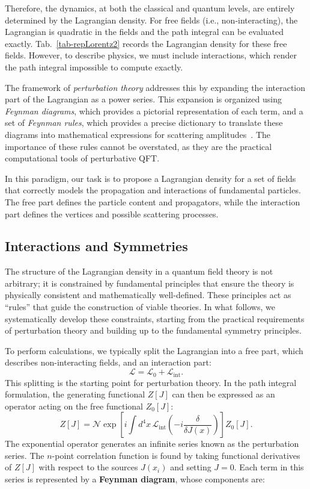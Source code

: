 Therefore, the dynamics, at both the classical and quantum levels, are entirely determined by the Lagrangian density. For free fields (i.e., non-interacting), the Lagrangian is quadratic in the fields and the path integral can be evaluated exactly. Tab.~\ref{tab-repLorentz2} records the Lagrangian density for these free fields. However, to describe physics, we must include interactions, which render the path integral impossible to compute exactly.

The framework of \textit{perturbation theory} addresses this by expanding the interaction part of the Lagrangian as a power series. This expansion is organized using \textit{Feynman diagrams}, which provides a pictorial representation of each term, and a set of \textit{Feynman rules}, which provides a precise dictionary to translate these diagrams into mathematical expressions for scattering amplitudes~\parencite{peskin,Weinberg}. The importance of these rules cannot be overstated, as they are the practical computational tools of perturbative QFT.


In this paradigm, our task is to propose a Lagrangian density for a set of fields that correctly models the propagation and interactions of fundamental particles. The free part defines the particle content and propagators, while the interaction part defines the vertices and possible scattering processes.

\subsection{Interactions and Symmetries} 

The structure of the Lagrangian density in a quantum field theory is not arbitrary; it is constrained by fundamental principles that ensure the theory is physically consistent and mathematically well-defined. These principles act as ``rules'' that guide the construction of viable theories. In what follows, we systematically develop these constraints, starting from the practical requirements of perturbation theory and building up to the fundamental symmetry principles.

To perform calculations, we typically split the Lagrangian into a free part, which describes non-interacting fields, and an interaction part:
\begin{equation}
    \mathcal{L} = \mathcal{L}_0 + \mathcal{L}_{\text{int}}.
\end{equation}
This splitting is the starting point for perturbation theory. In the path integral formulation, the generating functional $Z[J]$ can then be expressed as an operator acting on the free functional $Z_0[J]$:
\begin{equation}
    Z[J] = \mathcal{N} \exp\left[i \int d^4x\, \mathcal{L}_{\text{int}}\left(-i \frac{\delta}{\delta J(x)}\right)\right] Z_0[J].
\end{equation}
The exponential operator generates an infinite series known as the perturbation series. The $n$-point correlation function is found by taking functional derivatives of $Z[J]$ with respect to the sources $J(x_i)$ and setting $J=0$. Each term in this series is represented by a \textbf{Feynman diagram}, whose components are:

